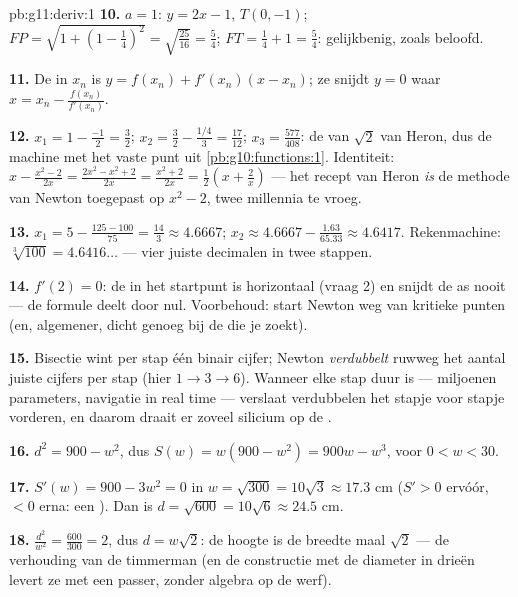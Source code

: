 \begin{solution}{pb:g11:deriv:1}
\textbf{10.} $a = 1$:  $y = 2x - 1$, $T(0, -1)$;
$FP = \sqrt{1 + \left(1 - \frac14\right)^2} = \sqrt{\frac{25}{16}} =
\frac54$; $FT = \frac14 + 1 = \frac54$: gelijkbenig, zoals beloofd.

\textbf{11.} De  in $x_n$ is $y = f(x_n) + f'(x_n)(x - x_n)$; ze
snijdt $y = 0$ waar $x = x_n - \frac{f(x_n)}{f'(x_n)}$.

\textbf{12.} $x_1 = 1 - \frac{-1}{2} = \frac32$;
$x_2 = \frac32 - \frac{1/4}{3} = \frac{17}{12}$; $x_3 = \frac{577}{408}$:
de  van $\sqrt2$ van Heron, dus de machine met het vaste punt
uit \cref{pb:g10:functions:1}. Identiteit:
$x - \frac{x^2 - 2}{2x} = \frac{2x^2 - x^2 + 2}{2x} = \frac{x^2 + 2}{2x}
= \frac12\left(x + \frac2x\right)$ --- het recept van Heron \emph{is} de
methode van Newton toegepast op $x^2 - 2$, twee millennia te vroeg.

\textbf{13.} $x_1 = 5 - \frac{125 - 100}{75} = \frac{14}{3} \approx 4.6667$;
$x_2 \approx 4.6667 - \frac{1.63}{65.33} \approx 4.6417$. Rekenmachine:
$\sqrt[3]{100} = 4.6416\ldots$ --- vier juiste decimalen in twee stappen.

\textbf{14.} $f'(2) = 0$: de  in het startpunt is horizontaal (vraag
2) en snijdt de as nooit --- de formule deelt door nul. Voorbehoud: start
Newton weg van kritieke punten (en, algemener, dicht genoeg bij de 
die je zoekt).

\textbf{15.} Bisectie wint per stap één binair cijfer; Newton
\emph{verdubbelt} ruwweg het aantal juiste cijfers per stap (hier
$1 \to 3 \to 6$). Wanneer elke stap duur is --- miljoenen parameters,
navigatie in real time --- verslaat verdubbelen het stapje voor stapje
vorderen, en daarom draait er zoveel silicium op de .

\textbf{16.} $d^2 = 900 - w^2$, dus $S(w) = w(900 - w^2) = 900w - w^3$, voor
$0 < w < 30$.

\textbf{17.} $S'(w) = 900 - 3w^2 = 0$ in $w = \sqrt{300} = 10\sqrt3
\approx 17.3$ cm ($S' > 0$ ervóór, $< 0$ erna: een ). Dan is
$d = \sqrt{600} = 10\sqrt6 \approx 24.5$ cm.

\textbf{18.} $\frac{d^2}{w^2} = \frac{600}{300} = 2$, dus $d = w\sqrt2$: de
hoogte is de breedte maal $\sqrt2$ --- de verhouding van de timmerman (en de
constructie met de diameter in drieën levert ze met een passer, zonder
algebra op de werf).


\end{solution}
